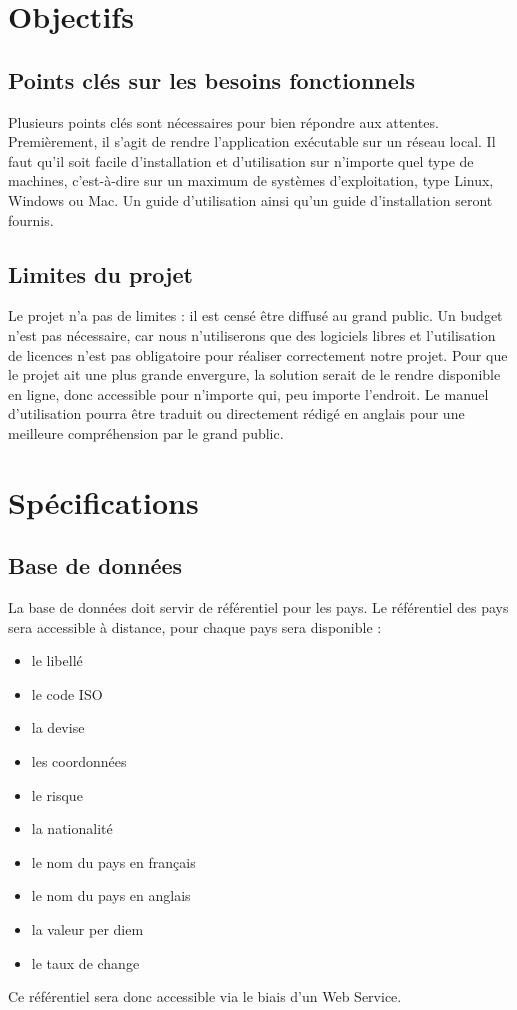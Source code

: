 \documentclass[12pt,a4paper,article]{memoir} %
\begin{document}
\chapter{Objectifs}

\section{Points clés sur les besoins fonctionnels}
Plusieurs points clés sont nécessaires pour bien répondre aux attentes. Premièrement, il s'agit
de rendre l'application exécutable sur un réseau local. Il faut qu'il soit facile d’installation et
d'utilisation sur n'importe quel type de machines, c'est-à-dire sur un maximum de systèmes
d'exploitation, type Linux, Windows ou Mac.
Un guide d'utilisation ainsi qu’un guide d’installation seront fournis.

\section{Limites du projet}
Le projet n’a pas de limites : il est censé être diffusé au grand public. Un budget n'est pas
nécessaire, car nous n’utiliserons que des logiciels libres et l'utilisation de licences n'est pas
obligatoire pour réaliser correctement notre projet.
Pour que le projet ait une plus grande envergure, la solution serait de le rendre disponible en
ligne, donc accessible pour n'importe qui, peu importe l'endroit.
Le manuel d’utilisation pourra être traduit ou directement rédigé en anglais pour une
meilleure compréhension par le grand public.

\chapter{Spécifications}

\section{Base de données}
La base de données doit servir de référentiel pour les pays.
\break
Le référentiel des pays sera accessible à distance, pour chaque pays sera disponible :
\begin{itemize}
\item le libellé
\item le code ISO
\item la devise
\item les coordonnées
\item le risque
\item la nationalité
\item le nom du pays en français
\item le nom du pays en anglais
\item la valeur per diem
\item le taux de change
\end{itemize}
Ce référentiel sera donc accessible via le biais d’un Web Service.
\end{document}
